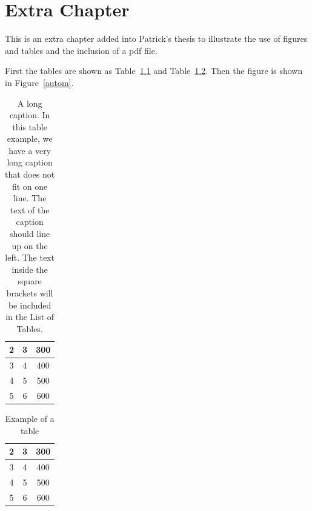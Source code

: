 
\chapter{Extra Chapter}

This is an extra chapter added into Patrick's thesis to illustrate
the use of figures and tables and the inclusion of a pdf file.

First the tables are shown as Table~\ref{smalltable} and
Table~\ref{smalltable2}. Then the
figure is shown in Figure~\ref{autom}.

\begin{table}
\begin{center}
\caption[A long caption]{A long caption.
In this table example, we have a very
long caption that does not fit on one line. The text of the
caption should line up on the left. The text inside the square
brackets will be included in the List of Tables.}
\label{smalltable}
\vspace{0.2in}
\begin{tabular}{|c|c|c|}\hline
2 & 3 & 300 \\ \hline
3 & 4 & 400 \\ \hline
4 & 5 & 500 \\ \hline
5 & 6 & 600 \\ \hline
\end{tabular}
\end{center}
\end{table}

\begin{table}
\begin{center}
\caption{Example of a table}
\label{smalltable2}
\vspace{0.2in}
\begin{tabular}{|c|c|c|}\hline
2 & 3 & 300 \\ \hline
3 & 4 & 400 \\ \hline
4 & 5 & 500 \\ \hline
5 & 6 & 600 \\ \hline
\end{tabular}
\end{center}
\end{table}

